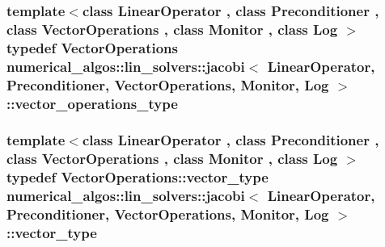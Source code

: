 \hypertarget{classnumerical__algos_1_1lin__solvers_1_1jacobi_ab8b9ebf933c4357daf0f00205decc710}{
\subsubsection[{vector\-\_\-operations\-\_\-type}]{\setlength{\rightskip}{0pt plus 5cm}template$<$class Linear\-Operator , class Preconditioner , class Vector\-Operations , class Monitor , class Log $>$ typedef Vector\-Operations {\bf numerical\-\_\-algos\-::lin\-\_\-solvers\-::jacobi}$<$ Linear\-Operator, Preconditioner, Vector\-Operations, Monitor, Log $>$\-::{\bf vector\-\_\-operations\-\_\-type}}}\label{classnumerical__algos_1_1lin__solvers_1_1jacobi_ab8b9ebf933c4357daf0f00205decc710}
\hypertarget{classnumerical__algos_1_1lin__solvers_1_1jacobi_a4888a70950925266c654b6ec835dee85}{
\subsubsection[{vector\-\_\-type}]{\setlength{\rightskip}{0pt plus 5cm}template$<$class Linear\-Operator , class Preconditioner , class Vector\-Operations , class Monitor , class Log $>$ typedef Vector\-Operations\-::vector\-\_\-type {\bf numerical\-\_\-algos\-::lin\-\_\-solvers\-::jacobi}$<$ Linear\-Operator, Preconditioner, Vector\-Operations, Monitor, Log $>$\-::{\bf vector\-\_\-type}}}\label{classnumerical__algos_1_1lin__solvers_1_1jacobi_a4888a70950925266c654b6ec835dee85}


